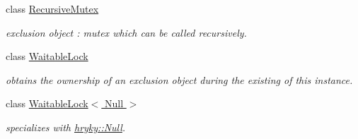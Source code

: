 \begin{DoxyCompactItemize}
class \hyperlink{classhryky_1_1exclusion_1_1_recursive_mutex}{Recursive\-Mutex}
\begin{DoxyCompactList}\small\item\em exclusion object \-: mutex which can be called recursively. \end{DoxyCompactList}\item 
class \hyperlink{classhryky_1_1exclusion_1_1_waitable_lock}{Waitable\-Lock}
\begin{DoxyCompactList}\small\item\em obtains the ownership of an exclusion object during the existing of this instance. \end{DoxyCompactList}\item 
class \hyperlink{classhryky_1_1exclusion_1_1_waitable_lock_3_01_null_01_4}{Waitable\-Lock$<$ Null $>$}
\begin{DoxyCompactList}\small\item\em specializes with \hyperlink{classhryky_1_1_null}{hryky\-::\-Null}. \end{DoxyCompactList}\end{DoxyCompactItemize}
